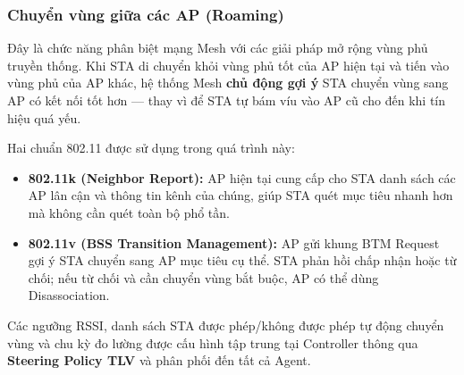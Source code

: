 \subsubsection{Chuyển vùng giữa các AP (Roaming)}

Đây là chức năng phân biệt mạng Mesh với các giải pháp mở rộng vùng phủ truyền thống.
Khi STA di chuyển khỏi vùng phủ tốt của AP hiện tại và tiến vào vùng phủ của AP khác,
hệ thống Mesh \textbf{chủ động gợi ý} STA chuyển vùng sang AP có kết nối tốt hơn ---
thay vì để STA tự bám víu vào AP cũ cho đến khi tín hiệu quá yếu.

Hai chuẩn 802.11 được sử dụng trong quá trình này:
\begin{itemize}
	\item \textbf{802.11k (Neighbor Report):} AP hiện tại cung cấp cho STA danh sách
	các AP lân cận và thông tin kênh của chúng, giúp STA quét mục tiêu nhanh hơn
	mà không cần quét toàn bộ phổ tần.
	\item \textbf{802.11v (BSS Transition Management):} AP gửi khung BTM Request gợi ý
	STA chuyển sang AP mục tiêu cụ thể. STA phản hồi chấp nhận hoặc từ chối;
	nếu từ chối và cần chuyển vùng bắt buộc, AP có thể dùng Disassociation.
\end{itemize}

Các ngưỡng RSSI, danh sách STA được phép/không được phép tự động chuyển vùng và chu
kỳ đo lường được cấu hình tập trung tại Controller thông qua \textbf{Steering Policy
	TLV} và phân phối đến tất cả Agent.

